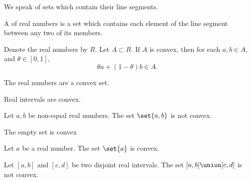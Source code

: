 
\sbasic



\sstart



We speak of sets
which contain
their line segments.


A
of real numbers is
a set which contains
each element of the line
segment between any
two of its members.


Denote the real numbers
by $R$.
Let $A \subset R$.
If $A$ is convex,
then for each
$a, b \in A$,
and $\theta \in [0, 1]$,
\[
  \theta a + (1-\theta) b \in A.
\]


\begin{expl}
  The real numbers
  are a convex set.
\end{expl}

\begin{expl}
  Real intervals are convex.
\end{expl}

\begin{expl}
  Let $a,b$ be
  non-equal real numbers.
  The set $\set{a,b}$ is
  not convex.
\end{expl}

\begin{expl}
  The empty set is convex
\end{expl}

\begin{expl}
  Let $a$ be a real number.
  The set $\set{a}$ is convex.
\end{expl}

\begin{expl}
  Let $[a, b]$
  and $[c,d]$ be
  two disjoint real
  intervals.
  The set
  $[a,b]\union[c,d]$
  is not convex.
\end{expl}

\strats
